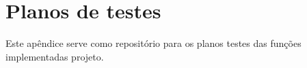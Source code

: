 \begin{apendicesenv}\label{apendiceA} %

\chapter{Planos de testes}

Este apêndice serve como repositório para os planos testes das funções implementadas projeto.

\end{apendicesenv}